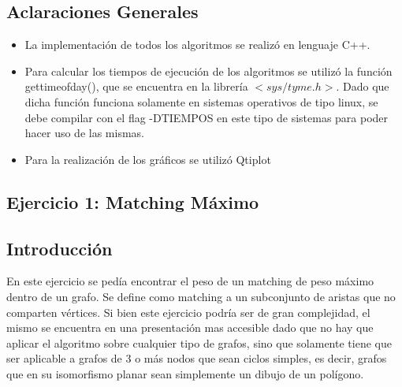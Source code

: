 \documentclass[a4paper, 12pt]{article}
\begin{document}
\tableofcontents

\newpage


\begin{center}
\section*{Aclaraciones Generales}

\begin{itemize}
\item La implementaci\'on de todos los algoritmos se realiz\'o en lenguaje C++.

\item Para calcular los tiempos de ejecuci\'on de los algoritmos se utiliz\'o la funci\'on gettimeofday(), que se encuentra en la librer\'ia $<sys/tyme.h>$. Dado que dicha funci\'on funciona solamente en sistemas operativos de tipo linux, se debe compilar con el flag -DTIEMPOS en este tipo de sistemas para poder hacer uso de las mismas.

\item Para la realizaci\'on de los gr\'aficos se utiliz\'o Qtiplot
\end{itemize}

\end{center}

\newpage
\begin{center}
\section*{Ejercicio 1: Matching Máximo}
\end{center}
 
\subsection*{Introducción}
En este ejercicio se pedía encontrar el peso de un matching de peso máximo dentro de un grafo. Se define como matching a un subconjunto de aristas que no comparten vértices. Si bien este ejercicio podría ser de gran complejidad, el mismo se encuentra en una presentación mas accesible dado que no hay que aplicar el algoritmo sobre cualquier tipo de grafos, sino que solamente tiene que ser aplicable a grafos de 3 o más nodos que sean ciclos simples, es decir, grafos que en su isomorfismo planar sean simplemente un dibujo de un polígono.
\end{document}
